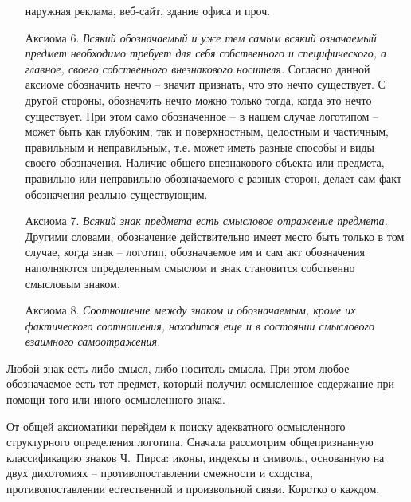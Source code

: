\begin{itemize}
  наружная реклама, веб-сайт, здание офиса и проч.
\item[Аксиома 6.] \emph{Всякий обозначаемый и уже тем самым всякий означаемый
    предмет необходимо требует для себя собственного и специфического, а
    главное, своего собственного внезнакового носителя.}
  Согласно данной аксиоме обозначить нечто -- значит признать, что это
  нечто существует. С другой стороны, обозначить нечто можно только тогда,
  когда это нечто существует. При этом само обозначенное -- в нашем случае
  логотипом -- может быть как глубоким, так и поверхностным, целостным и
  частичным, правильным и неправильным, т.е. может иметь разные способы и
  виды своего обозначения. Наличие общего внезнакового объекта или предмета,
  правильно или неправильно обозначаемого с разных сторон, делает сам
  факт обозначения реально существующим.
\item[Аксиома 7.] \emph{Всякий знак предмета есть смысловое отражение
    предмета.} Другими словами, обозначение действительно имеет место
  быть только в том случае, когда знак -- логотип, обозначаемое им и
  сам акт обозначения наполняются определенным смыслом и знак становится
  собственно смысловым знаком.
\item[Аксиома 8.] \emph{Соотношение между знаком и обозначаемым, кроме
    их фактического соотношения, находится еще и в состоянии смыслового
    взаимного самоотражения.}
\end{itemize}
Любой знак есть либо смысл, либо носитель смысла. При этом любое обозначаемое
есть тот предмет, который получил осмысленное содержание при помощи того или
иного осмысленного знака.

От общей аксиоматики перейдем к поиску адекватного осмысленного структурного
определения логотипа. Сначала рассмотрим общепризнанную  классификацию знаков
Ч.~Пирса: иконы, индексы и символы,  основанную на двух дихотомиях --
противопоставлении смежности и сходства, противопоставлении естественной
и произвольной связи.\autocite[322]{jakobson1985} Коротко о каждом.


